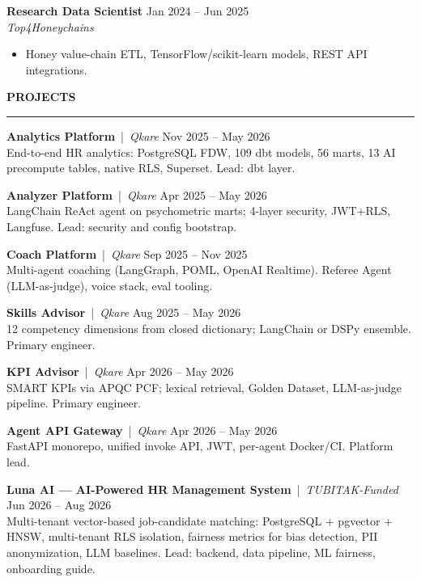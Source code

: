 \documentclass[11pt,a4paper]{article}
\newcommand{\cvsection}[1]{%
  \vspace{1.2em}%
  {\large\textbf{\MakeUppercase{#1}}}\\[0.2em]
  \hrule
  \vspace{0.6em}%
}
\newcommand{\jobentry}[4]{%
  \textbf{#1} \hfill {\small #2}\\
  \textit{#3} \hfill {\small #4}\\[0.2em]
}
\begin{document}
\jobentry{Research Data Scientist}{Jan 2024 -- Jun 2025}{Top4Honeychains}{}
\begin{itemize}[leftmargin=1.5em, nosep, topsep=2pt, itemsep=2pt]
  \item Honey value-chain ETL, TensorFlow/scikit-learn models, REST API integrations.
\end{itemize}

\cvsection{Projects}

\textbf{Analytics Platform} \,|\, \textit{Qkare} \hfill Nov 2025 -- May 2026\\
End-to-end HR analytics: PostgreSQL FDW, 109 dbt models, 56 marts, 13 AI precompute tables, native RLS, Superset. Lead: dbt layer.
\vspace{0.5em}

\textbf{Analyzer Platform} \,|\, \textit{Qkare} \hfill Apr 2025 -- May 2026\\
LangChain ReAct agent on psychometric marts; 4-layer security, JWT+RLS, Langfuse. Lead: security and config bootstrap.
\vspace{0.5em}

\textbf{Coach Platform} \,|\, \textit{Qkare} \hfill Sep 2025 -- Nov 2025\\
Multi-agent coaching (LangGraph, POML, OpenAI Realtime). Referee Agent (LLM-as-judge), voice stack, eval tooling.
\vspace{0.5em}

\textbf{Skills Advisor} \,|\, \textit{Qkare} \hfill Aug 2025 -- May 2026\\
12 competency dimensions from closed dictionary; LangChain or DSPy ensemble. Primary engineer.
\vspace{0.5em}

\textbf{KPI Advisor} \,|\, \textit{Qkare} \hfill Apr 2026 -- May 2026\\
SMART KPIs via APQC PCF; lexical retrieval, Golden Dataset, LLM-as-judge pipeline. Primary engineer.
\vspace{0.5em}

\textbf{Agent API Gateway} \,|\, \textit{Qkare} \hfill Apr 2026 -- May 2026\\
FastAPI monorepo, unified invoke API, JWT, per-agent Docker/CI. Platform lead.
\vspace{0.5em}

\textbf{Luna AI --- AI-Powered HR Management System} \,|\, \textit{TUBITAK-Funded} \hfill Jun 2026 -- Aug 2026\\
Multi-tenant vector-based job-candidate matching: PostgreSQL + pgvector + HNSW, multi-tenant RLS isolation, fairness metrics for bias detection, PII anonymization, LLM baselines. Lead: backend, data pipeline, ML fairness, onboarding guide.
\vspace{0.5em}
\end{document}
